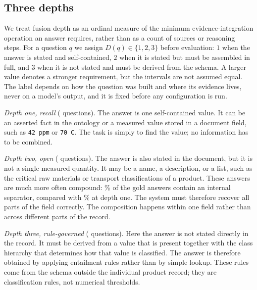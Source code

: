 \documentclass[conference]{IEEEtran}
\begin{document}
\subsection{Three depths}
We treat fusion depth as an ordinal measure of the minimum
evidence-integration operation an answer requires, rather than as a count of
sources or reasoning steps. For a question $q$ we assign $D(q)\in\{1,2,3\}$
before evaluation: $1$ when the answer is stated and self-contained, $2$ when it
is stated but must be assembled in full, and $3$ when it is not stated and must
be derived from the schema. A larger value denotes a stronger requirement, but
the intervals are not assumed equal. The label depends on how the question was
built and where its evidence lives, never on a model's output, and it is fixed
before any configuration is run.

\emph{Depth one, recall} (\NRecall{} questions). The answer is one
self-contained value. It can be an asserted fact in the ontology
or a measured value stored in a document field, such as
\texttt{42\,ppm} or \texttt{70\,\textdegree{}C}.
The task is simply to find the value; no information has to be combined.

\emph{Depth two, open} (\NOpen{} questions). The answer is also stated in
the document, but it is not a single measured quantity. It may be a name, a
description, or a list, such as the critical raw materials or transport
classifications of a product. These answers are much more often compound:
\DocCompoundPctOpen\% of the gold answers contain an internal separator,
compared with \DocCompoundPctRec\% at depth one. The system must therefore
recover all parts of the field correctly. The composition happens within one
field rather than across different parts of the record.

\emph{Depth three, rule-governed} (\NLogic{} questions). Here the answer
is not stated directly in the record. It must be derived from a value that is
present together with the class hierarchy that determines how that value is
classified. The answer is therefore obtained by applying entailment rules
rather than by simple lookup. These rules come from the schema outside the
individual product record; they are classification rules, not numerical
thresholds.

\end{document}
